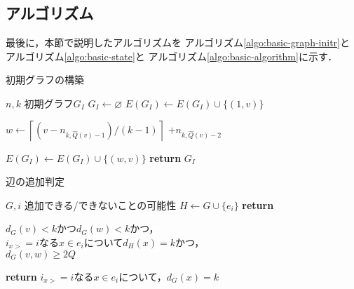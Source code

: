 \subsection{アルゴリズム}
\label{subsect:basic-algorithm}
最後に，本節で説明したアルゴリズムを
アルゴリズム\ref{algo:basic-graph-initr}と
アルゴリズム\ref{algo:basic-state}と
アルゴリズム\ref{algo:basic-algorithm}に示す．
\begin{algorithm}
  \caption{初期グラフの構築}
  \label{algo:basic-graph-initr}
  \begin{algorithmic}[1]
    \Require $n,k$
    \Ensure 初期グラフ$G_I$
    \State $G_I\gets \varnothing$
    \State $E(G_I)\gets E(G_I)\cup\{(1,v)\}$
    \EndFor
    \State \parbox[t]{.6\linewidth}{
      $w\gets \left\lceil(v-n_{k,\hat{Q}(v)-1})/(k-1)\right\rceil$
      $+n_{k,\hat{Q}(v)-2}$
    }
    \State $E(G_I)\gets E(G_I)\cup\{(w,v)\}$
    \EndFor
    \State \textbf{return} $G_I$
    \EndProcedure
  \end{algorithmic}
\end{algorithm}

\begin{algorithm}
  \caption{辺の追加判定}
  \label{algo:basic-state}
  \begin{algorithmic}[1]
    \Require $G,i$
    \Ensure 追加できる/できないことの可能性
    \State $H\gets G\cup\{e_i\}$
    \State \textbf{return} \parbox[t]{\linewidth}{
      $d_G(v)<k$かつ$d_G(w)<k$かつ，\\
      $i_{x>}=i$なる$x\in e_i$について$d_H(x)=k$かつ， \\
      $d_G(v,w)\geq2Q$
    }
    \EndProcedure
    \State \textbf{return} $i_{x>}=i$なる$x\in e_i$について，$d_G(x)=k$
    \EndProcedure
  \end{algorithmic}
\end{algorithm}

